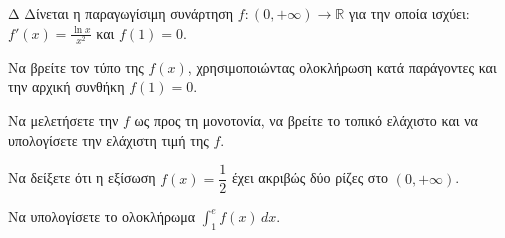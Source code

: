 \begin{thema}{Δ}
Δίνεται η παραγωγίσιμη συνάρτηση $f:(0, +\infty)\to\mathbb{R}$ για την οποία ισχύει: $f'(x) = \frac{\ln x}{x^2}$ και $f(1)=0$.
\begin{erwthma}
    \item Να βρείτε τον τύπο της $f(x)$, χρησιμοποιώντας ολοκλήρωση κατά παράγοντες και την αρχική συνθήκη $f(1)=0$.
    \item Να μελετήσετε την $f$ ως προς τη μονοτονία, να βρείτε το τοπικό ελάχιστο και να υπολογίσετε την ελάχιστη τιμή της $f$.
    \item Να δείξετε ότι η εξίσωση $f(x) = \dfrac{1}{2}$ έχει ακριβώς δύο ρίζες στο $(0, +\infty)$.
    \item Να υπολογίσετε το ολοκλήρωμα $\displaystyle\int_1^e f(x)\,dx$.
\end{erwthma}
\end{thema}
